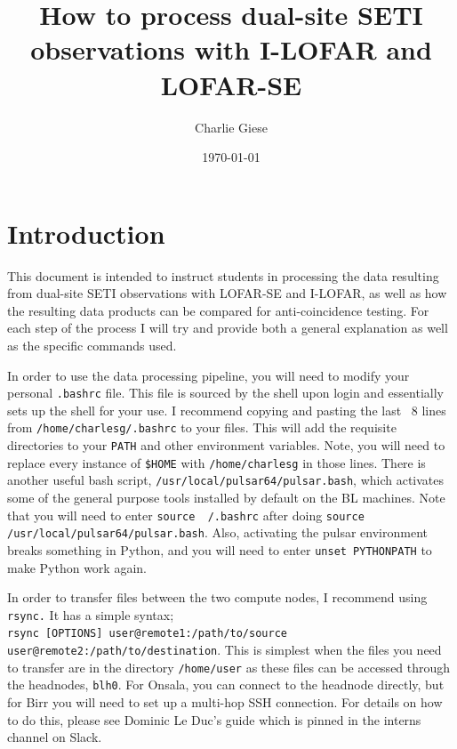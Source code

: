 \documentclass[12pt, onepage]{article}
\title{How to process dual-site SETI observations with I-LOFAR and LOFAR-SE}
\date{\today}
\author{Charlie Giese}
\numberwithin{equation}{section} %
\begin{document}
\maketitle



\linespread{1.2}

\tableofcontents
 

 
\newpage
\linespread{1.5}

\section{Introduction}
This document is intended to instruct students in processing the data resulting from dual-site SETI observations with LOFAR-SE and I-LOFAR, as well as how the resulting data products can be compared for anti-coincidence testing. For each step of the process I will try and provide both a general explanation as well as the specific commands used. 

In order to use the data processing pipeline, you will need to modify your personal \texttt{.bashrc} file. This file is sourced by the shell upon login and essentially sets up the shell for your use. I recommend copying and pasting the last ~8 lines from \texttt{/home/charlesg/.bashrc} to your files. This will add the requisite directories to your \texttt{PATH} and other environment variables. Note, you will need to replace every instance of \texttt{\$HOME} with \texttt{/home/charlesg} in those lines. There is another useful bash script, \texttt{/usr/local/pulsar64/pulsar.bash}, which activates some of the general purpose tools installed by default on the BL machines. Note that you will need to enter \texttt{source ~/.bashrc} after doing \texttt{source /usr/local/pulsar64/pulsar.bash}. Also, activating the pulsar environment breaks something in Python, and you will need to enter \texttt{unset PYTHONPATH} to make Python work again.

In order to transfer files between the two compute nodes, I recommend using \texttt{rsync.} It has a simple syntax;\\
\noindent
\texttt{rsync [OPTIONS] user@remote1:/path/to/source \\ user@remote2:/path/to/destination}. 
This is simplest when the files you need to transfer are in the directory \texttt{/home/user} as these files can be accessed through the headnodes, \texttt{blh0}. For Onsala, you can connect to the headnode directly, but for Birr you will need to set up a multi-hop SSH connection. For details on how to do this, please see Dominic Le Duc's guide which is pinned in the interns channel on Slack.
\end{document}
